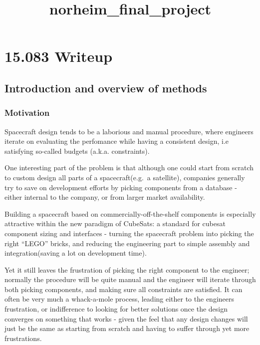 \documentclass[11pt]{article}
\title{norheim\_final\_project}
\begin{document}
    
    
    \maketitle
    
    

    
    \hypertarget{writeup}{%
\section{15.083 Writeup}\label{writeup}}

    \hypertarget{introduction-and-overview-of-methods}{%
\subsection{Introduction and overview of
methods}\label{introduction-and-overview-of-methods}}

\hypertarget{motivation}{%
\subsubsection{Motivation}\label{motivation}}

Spacecraft design tends to be a laborious and manual procedure, where
engineers iterate on evaluating the perfomance while having a consistent
design, i.e satisfying so-called budgets (a.k.a. constraints).

One interesting part of the problem is that although one could start
from scratch to custom design all parts of a spacecraft(e.g.~a
satellite), companies generally try to save on development efforts by
picking components from a database - either internal to the company, or
from larger market availability.

Building a spacecraft based on commercially-off-the-shelf components is
especially attractive within the new paradigm of CubeSats: a standard
for cubesat component sizing and interfaces - turning the spacecraft
problem into picking the right ``LEGO'' bricks, and reducing the
engineering part to simple assembly and integration(saving a lot on
development time).

Yet it still leaves the frustration of picking the right component to
the engineer; normally the procedure will be quite manual and the
engineer will iterate through both picking components, and making sure
all constraints are satisfied. It can often be very much a whack-a-mole
process, leading either to the engineers frustration, or indifference to
looking for better solutions once the design converges on something that
works - given the feel that any design changes will just be the same as
starting from scratch and having to suffer through yet more
frustrations.
\end{document}
